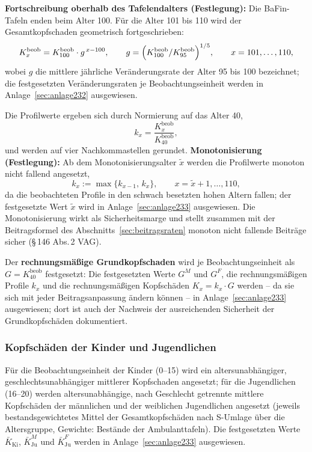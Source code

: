 \textbf{Fortschreibung oberhalb des Tafelendalters (Festlegung):} Die
BaFin-Tafeln enden beim Alter 100. Für die Alter 101 bis 110 wird der
Gesamtkopfschaden geometrisch fortgeschrieben:
\begin{equation}
K^{\mathrm{beob}}_x = K^{\mathrm{beob}}_{100}\cdot g^{\,x-100},
\qquad
g = \Bigl(K^{\mathrm{beob}}_{100} / K^{\mathrm{beob}}_{95}\Bigr)^{1/5},
\qquad x = 101,\dots,110,
\label{eq:kfort}
\end{equation}
wobei $g$ die mittlere jährliche Veränderungsrate der Alter 95 bis 100
bezeichnet; die festgesetzten Veränderungsraten je Beobachtungseinheit
werden in Anlage~\ref{sec:anlage232} ausgewiesen.

Die Profilwerte ergeben sich durch Normierung auf das Alter 40,
\begin{equation}
k_x = \frac{K^{\mathrm{beob}}_x}{K^{\mathrm{beob}}_{40}},
\label{eq:profil}
\end{equation}
und werden auf vier Nachkommastellen gerundet.
\textbf{Monotonisierung (Festlegung):} Ab dem Monotonisierungsalter
$\tilde{x}$ werden die Profilwerte monoton nicht fallend angesetzt,
\begin{equation}
k_x := \max\{k_{x-1},\, k_x\}, \qquad x = \tilde{x}+1,\dots,110,
\label{eq:mono}
\end{equation}
da die beobachteten Profile in den schwach besetzten hohen Altern
fallen; der festgesetzte Wert $\tilde{x}$ wird in
Anlage~\ref{sec:anlage233} ausgewiesen. Die Monotonisierung wirkt als
Sicherheitsmarge und stellt
zusammen mit der Beitragsformel des Abschnitts~\ref{sec:beitragsraten}
monoton nicht fallende Beiträge sicher (\S\,146 Abs.\,2 VAG).

Der \textbf{rechnungsmäßige Grundkopfschaden} wird je
Beobachtungseinheit als $G = K^{\mathrm{beob}}_{40}$ festgesetzt:
Die festgesetzten Werte $G^{M}$ und $G^{F}$, die rechnungsmäßigen
Profile $k_x$ und die rechnungsmäßigen Kopfschäden $K_x = k_x\cdot G$
werden -- da sie sich mit jeder Beitragsanpassung ändern können --
in Anlage~\ref{sec:anlage233} ausgewiesen; dort ist auch
der Nachweis der ausreichenden Sicherheit der Grundkopfschäden
dokumentiert.

\subsubsection{Kopfschäden der Kinder und Jugendlichen}
\label{sec:kopfschaden-kinder}

Für die Beobachtungseinheit der Kinder (0--15) wird ein
altersunabhängiger, geschlechtsunabhängiger mittlerer Kopfschaden
angesetzt; für die Jugendlichen (16--20) werden altersunabhängige,
nach Geschlecht getrennte mittlere Kopfschäden der männlichen und der
weiblichen Jugendlichen angesetzt (jeweils bestandsgewichtetes Mittel
der Gesamtkopfschäden nach S-Umlage über die Altersgruppe, Gewichte:
Bestände der Ambulanttafeln). Die festgesetzten Werte
$\bar{K}_{\mathrm{Ki}}$, $\bar{K}^{M}_{\mathrm{Ju}}$ und
$\bar{K}^{F}_{\mathrm{Ju}}$ werden in Anlage~\ref{sec:anlage233}
ausgewiesen.

